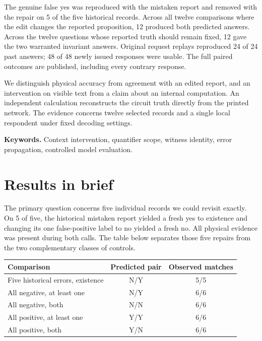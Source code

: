 \documentclass[12pt,letterpaper]{article}
\begin{document}
The genuine false yes was reproduced with the mistaken report and removed with the repair on 5 of the five historical records. Across all twelve comparisons where the edit changes the reported proposition, 12 produced both predicted answers. Across the twelve questions whose reported truth should remain fixed, 12 gave the two warranted invariant answers. Original request replays reproduced 24 of 24 past answers; 48 of 48 newly issued responses were usable. The full paired outcomes are published, including every contrary response.

We distinguish physical accuracy from agreement with an edited report, and an intervention on visible text from a claim about an internal computation. An independent calculation reconstructs the circuit truth directly from the printed network. The evidence concerns twelve selected records and a single local respondent under fixed decoding settings.

\vfill\textbf{Keywords.} Context intervention, quantifier scope, witness identity, error propagation, controlled model evaluation.\clearpage{\small\setlength{\parskip}{0pt}\tableofcontents}\clearpage{}

\section{Results in brief}

The primary question concerns five individual records we could revisit exactly. On 5 of five, the historical mistaken report yielded a fresh yes to existence and changing its one false-positive label to no yielded a fresh no. All physical evidence was present during both calls. The table below separates those five repairs from the two complementary classes of controls.

\begin{center}\small\begin{tabular}{@{}lcc@{}}\toprule
Comparison & Predicted pair & Observed matches\\\midrule
Five historical errors, existence & N/Y & 5/5\\
All negative, at least one & N/Y & 6/6\\
All negative, both & N/N & 6/6\\
All positive, at least one & Y/Y & 6/6\\
All positive, both & Y/N & 6/6\\\bottomrule\end{tabular}\end{center}
\end{document}
